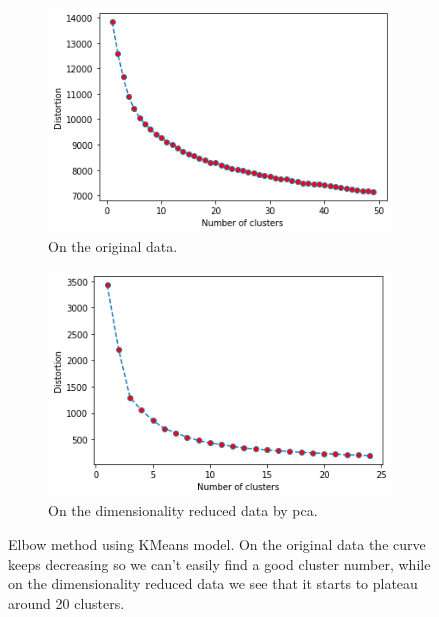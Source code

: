 \documentclass[runningheads]{llncs}
\begin{document}
\begin{figure}
  \centering
  \begin{subfigure}[b]{0.49\textwidth}
    \includegraphics[width=\textwidth]{images/kmeans_elbow.png}
    \caption{On the original data.}
    \label{kmeans_elbow}
  \end{subfigure}
  \hfill
  \begin{subfigure}[b]{0.49\textwidth}
    \includegraphics[width=\textwidth]{images/kmeans_pca_elbow.png}
    \caption{On the dimensionality reduced data by pca.}
    \label{kmeans_pca_elbow}
  \end{subfigure}
  \caption{Elbow method using KMeans model. On the original data the curve keeps decreasing so we can't easily find a good cluster number, while on the dimensionality reduced data we see that it starts to plateau around 20 clusters.}
\end{figure}
\end{document}
